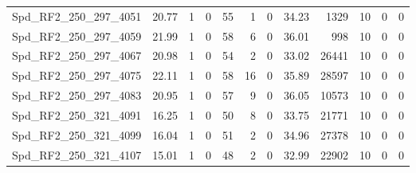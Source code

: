 \begin{longtable}[c]{@{}lrrrrrrrrrrr@{}}
Spd\_RF2\_250\_297\_4051     & 20.77                  & 1                       & 0                       & 55                     & 1                       & 0                       & 34.23                   & 1329                     & 10                       & 0                        & 0                        \\
Spd\_RF2\_250\_297\_4059     & 21.99                  & 1                       & 0                       & 58                     & 6                       & 0                       & 36.01                   & 998                      & 10                       & 0                        & 0                        \\
Spd\_RF2\_250\_297\_4067     & 20.98                  & 1                       & 0                       & 54                     & 2                       & 0                       & 33.02                   & 26441                    & 10                       & 0                        & 0                        \\
Spd\_RF2\_250\_297\_4075     & 22.11                  & 1                       & 0                       & 58                     & 16                      & 0                       & 35.89                   & 28597                    & 10                       & 0                        & 0                        \\
Spd\_RF2\_250\_297\_4083     & 20.95                  & 1                       & 0                       & 57                     & 9                       & 0                       & 36.05                   & 10573                    & 10                       & 0                        & 0                        \\
Spd\_RF2\_250\_321\_4091     & 16.25                  & 1                       & 0                       & 50                     & 8                       & 0                       & 33.75                   & 21771                    & 10                       & 0                        & 0                        \\
Spd\_RF2\_250\_321\_4099     & 16.04                  & 1                       & 0                       & 51                     & 2                       & 0                       & 34.96                   & 27378                    & 10                       & 0                        & 0                        \\
Spd\_RF2\_250\_321\_4107     & 15.01                  & 1                       & 0                       & 48                     & 2                       & 0                       & 32.99                   & 22902                    & 10                       & 0                        & 0                        \\

\end{longtable}
